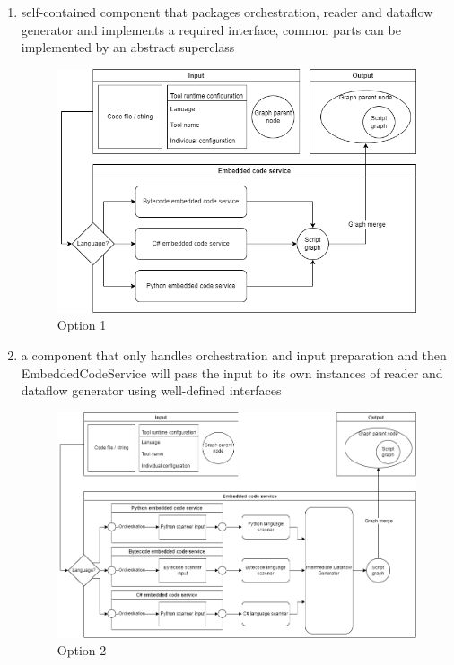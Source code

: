 \begin{enumerate}
    \item self-contained component that packages orchestration, reader and dataflow generator and implements a required interface, common parts can be implemented by an abstract superclass
        \begin{figure}[ht]\centering
        \includegraphics[width=1.0\textwidth]{img/Embedded code service base design 1.png}
        \caption{Option 1}
        \label{fig01:ECSbasedesign01}
        \end{figure}    
    \item a component that only handles orchestration and input preparation and then EmbeddedCodeService will pass the input to its own instances of reader and dataflow generator using well-defined interfaces
        \begin{figure}[ht]\centering
        \includegraphics[width=1.0\textwidth]{img/Embedded code service base design 2.png}
        \caption{Option 2}
        \label{fig01:ECSbasedesign02}
        \end{figure}    
\end{enumerate}

